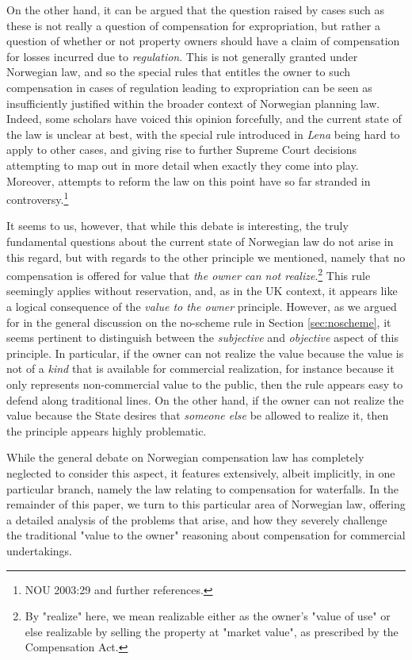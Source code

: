 On the other hand, it can be argued that the question raised by cases such as these is not really a question of compensation for expropriation, but rather a question of whether or not property owners should have a claim of compensation for losses incurred due to \emph{regulation}. This is not generally granted under Norwegian law, and so the special rules that entitles the owner to such compensation in cases of regulation leading to expropriation can be seen as insufficiently justified within the broader context of Norwegian planning law. Indeed, some scholars have voiced this opinion forcefully, and the current state of the law is unclear at best, with the special rule introduced in \emph{Lena} being hard to apply to other cases, and giving rise to further Supreme Court decisions attempting to map out in more detail when exactly they come into play. Moreover, attempts to reform the law on this point have so far stranded in controversy.\footnote{NOU 2003:29 and further references.}

It seems to us, however, that while this debate is interesting, the truly fundamental questions about the current state of Norwegian law do not arise in this regard, but with regards to the other principle we mentioned, namely that no compensation is offered for value that \emph{the owner can not realize}.\footnote{By "realize" here, we mean realizable either as the owner's "value of use" or else realizable by selling the property at "market value", as prescribed by the Compensation Act.} This rule seemingly applies without reservation, and, as in the UK context, it appears like a logical consequence of the \emph{value to the owner} principle. However, as we argued for in the general discussion on the no-scheme rule in Section \ref{sec:noscheme}, it seems pertinent to distinguish between the \emph{subjective} and \emph{objective} aspect of this principle. In particular, if the owner can not realize the value because the value is not of a \emph{kind} that is available for commercial realization, for instance because it only represents non-commercial value to the public, then the rule appears easy to defend along traditional lines. On the other hand, if the owner can not realize the value because the State desires that \emph{someone else} be allowed to realize it, then the principle appears highly problematic.

While the general debate on Norwegian compensation law has completely neglected to consider this aspect, it features extensively, albeit implicitly, in one particular branch, namely the law relating to compensation for waterfalls. In the remainder of this paper, we turn to this particular area of Norwegian law, offering a detailed analysis of the problems that arise, and how they severely challenge the traditional "value to the owner" reasoning about compensation for commercial undertakings. 

